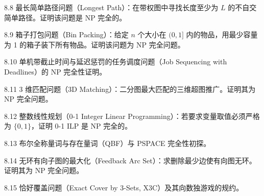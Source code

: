 \begin{exercise}{8.8}
最长简单路径问题（Longest Path）：在带权图中寻找长度至少为 $L$ 的不自交简单路径。证明该问题是 NP 完全的。
\end{exercise}

\begin{exercise}{8.9}
箱子打包问题（Bin Packing）：给定 $n$ 个大小在 $(0, 1]$ 内的物品，用最少容量为 1 的箱子装下所有物品。证明该问题为 NP 完全问题。
\end{exercise}

\begin{exercise}{8.10}
单机带截止时间与延迟惩罚的任务调度问题（Job Sequencing with Deadlines）的 NP 完全性证明。
\end{exercise}

\begin{exercise}{8.11}
3 维匹配问题（3D Matching）：二分图最大匹配的三维超图推广。证明其为 NP 完全问题。
\end{exercise}

\begin{exercise}{8.12}
整数线性规划（0-1 Integer Linear Programming）：若要求变量取值必须严格为 $\{0, 1\}$，证明 0-1 ILP 是 NP 完全的。
\end{exercise}

\begin{exercise}{8.13}
布尔全称量词与存在量词（QBF）与 PSPACE 完全性初探。
\end{exercise}

\begin{exercise}{8.14}
无环有向子图的最大化（Feedback Arc Set）：求删除最少边使有向图无环。证明其为 NP 完全问题。
\end{exercise}

\begin{exercise}{8.15}
恰好覆盖问题（Exact Cover by 3-Sets, X3C）及其向数独游戏的规约。
\end{exercise}
